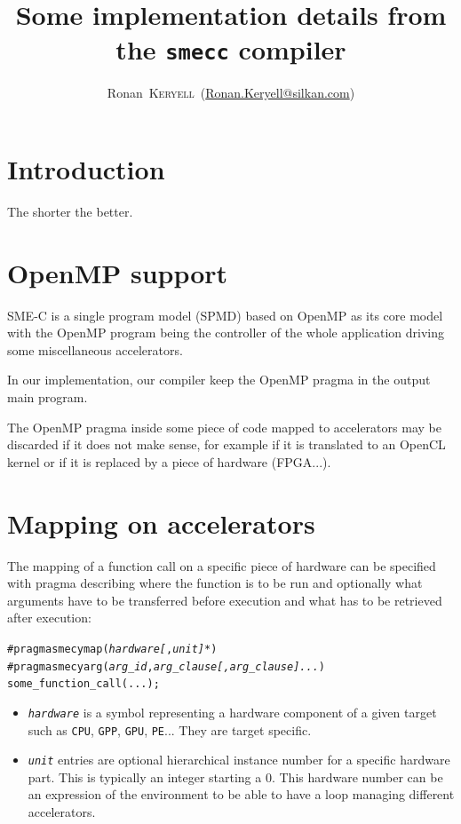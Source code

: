\documentclass[a4paper]{article}
\begin{document}
\title{Some implementation details from the \texttt{smecc} compiler}

\author{Ronan~\textsc{Keryell}~(\url{Ronan.Keryell@silkan.com})}

\maketitle

\tableofcontents{}


\section{Introduction}
\label{sec:introduction}

The shorter the better.

\section{OpenMP support}
\label{sec:openmp-support}

SME-C is a single program model (SPMD) based on OpenMP as its core model
with the OpenMP program being the controller of the whole application
driving some miscellaneous accelerators.

In our implementation, our compiler keep the OpenMP pragma in the output
main program.

The OpenMP pragma inside some piece of code mapped to accelerators may be
discarded if it does not make sense, for example if it is translated to an
OpenCL kernel or if it is replaced by a piece of hardware (FPGA...).


\section{Mapping on accelerators}
\label{sec:mapping-hardware}

The mapping of a function call on a specific piece of hardware can be
specified with pragma describing where the function is to be run and
optionally what arguments have to be transferred before execution and what
has to be retrieved after execution:
\begin{alltt}
#pragma smecy map(\emph{hardware[}, \emph{unit]*})
#pragma smecy arg(\emph{arg_id}, \emph{arg_clause[, arg_clause]...})
  some_function_call(...);
\end{alltt}

\begin{itemize}
\item \texttt{\emph{hardware}} is a symbol representing a hardware
  component of a given target such as \texttt{CPU}, \texttt{GPP},
  \texttt{GPU}, \texttt{PE}... They are target specific.
\item \texttt{\emph{unit}} entries are optional hierarchical instance
  number for a specific hardware part. This is typically an integer
  starting a 0. This hardware number can be an expression of the
  environment to be able to have a loop managing different accelerators.
\end{itemize}
\end{document}
